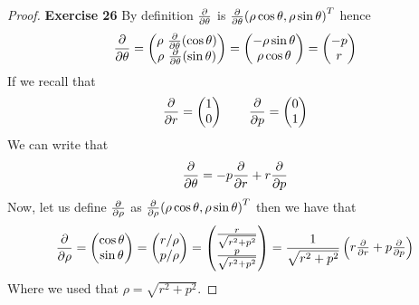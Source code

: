 \documentclass[11pt]{article}
\theoremstyle{definition}
\begin{document}
\begin{proof}{\textbf{Exercise 26}}
    By definition $\pdv{\theta}$ is
    $\pdv{\theta}(\rho\cos\theta, \rho\sin\theta)^T$ hence
    \begin{align*}
        \pdv{\theta} = \begin{pmatrix}
            \rho~\pdv{\theta}(\cos\theta)\\
            \rho~\pdv{\theta}(\sin\theta)
        \end{pmatrix}
        = \begin{pmatrix}
            -\rho\sin\theta\\
            \rho\cos\theta
        \end{pmatrix}
        = \begin{pmatrix}
            -p \\ r
        \end{pmatrix}
    \end{align*}
    If we recall that
    \begin{align*}
        \pdv{r} = \begin{pmatrix}1\\0\end{pmatrix} \qquad
        \pdv{p} = \begin{pmatrix}0\\1\end{pmatrix}
    \end{align*}
    We can write that
    \begin{align*}
        \pdv{\theta} = -p\pdv{r} + r\pdv{p}
    \end{align*}
    Now, let us define $\pdv{\rho}$ as $\pdv{\rho}(\rho\cos\theta, \rho\sin\theta)^T$
    then we have that
    \begin{align*}
        \pdv{\rho} = \begin{pmatrix}
            \cos\theta\\
            \sin\theta
        \end{pmatrix}
        = \begin{pmatrix}r/\rho\\ p/\rho\end{pmatrix}
        = \begin{pmatrix}
            \frac{r}{\sqrt{r^2 + p^2}}\\ \frac{p}{\sqrt{r^2 + p^2}}
        \end{pmatrix}
        = \frac{1}{\sqrt{r^2 + p^2}}\begin{pmatrix}
            r\pdv{r} + p\pdv{p}
        \end{pmatrix}
    \end{align*}
    Where we used that $\rho = \sqrt{r^2 + p^2}$.


\end{proof}
\end{document}
